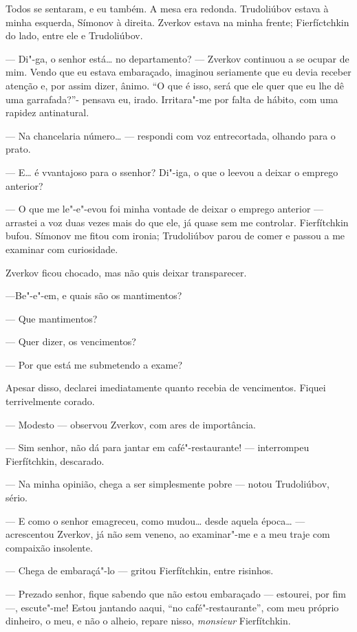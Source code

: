 Todos se sentaram, e eu também. A mesa era redonda. Trudoliúbov estava à
minha esquerda, Símonov à direita. Zverkov estava na minha frente;
Fierfíctchkin do lado, entre ele e Trudoliúbov.

--- Di"-ga, o senhor está\ldots{} no departamento? --- Zverkov continuou a se
ocupar de mim. Vendo que eu estava embaraçado, imaginou seriamente que
eu devia receber atenção e, por assim dizer, ânimo. ``O que é isso, será
que ele quer que eu lhe dê uma garrafada?''- pensava eu, irado.
Irritara"-me por falta de hábito, com uma rapidez antinatural.

--- Na chancelaria número\ldots{} --- respondi com voz entrecortada, olhando para
o prato.

--- E\ldots{} é vvantajoso para o ssenhor? Di"-iga, o que o leevou a deixar o
emprego anterior?

--- O que me le"-e"-evou foi minha vontade de deixar o emprego anterior ---
arrastei a voz duas vezes mais do que ele, já quase sem me controlar.
Fierfítchkin bufou. Símonov me fitou com ironia; Trudoliúbov parou de
comer e passou a me examinar com curiosidade.

Zverkov ficou chocado, mas não quis deixar transparecer.

---Be"-e"-em, e quais são os mantimentos?

--- Que mantimentos?

--- Quer dizer, os vencimentos?

--- Por que está me submetendo a exame?

Apesar disso, declarei imediatamente quanto recebia de vencimentos.
Fiquei terrivelmente corado.

--- Modesto --- observou Zverkov, com ares de importância.

--- Sim senhor, não dá para jantar em café"-restaurante! --- interrompeu
Fierfítchkin, descarado.

--- Na minha opinião, chega a ser simplesmente pobre --- notou Trudoliúbov,
sério.

--- E como o senhor emagreceu, como mudou\ldots{} desde aquela época\ldots{} ---
acrescentou Zverkov, já não sem veneno, ao examinar"-me e a meu traje com
compaixão insolente.

--- Chega de embaraçá"-lo --- gritou Fierfítchkin, entre risinhos.

--- Prezado senhor, fique sabendo que não estou embaraçado --- estourei,
por fim ---, escute"-me! Estou jantando aaqui, ``no café"-restaurante'', com
meu próprio dinheiro, o meu, e não o alheio, repare nisso,
\emph{monsieur} Fierfítchkin.

